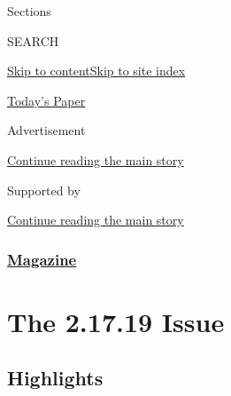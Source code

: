 Sections

SEARCH

\protect\hyperlink{site-content}{Skip to
content}\protect\hyperlink{site-index}{Skip to site index}

\href{https://myaccount.nytimes3xbfgragh.onion/auth/login?response_type=cookie\&client_id=vi}{}

\href{https://www.nytimes3xbfgragh.onion/section/todayspaper}{Today's
Paper}

Advertisement

\protect\hyperlink{after-top}{Continue reading the main story}

Supported by

\protect\hyperlink{after-sponsor}{Continue reading the main story}

\hypertarget{magazine}{%
\subsubsection{\texorpdfstring{\href{/section/magazine}{Magazine}}{Magazine}}\label{magazine}}

\hypertarget{the-21719-issue}{%
\section{The 2.17.19 Issue}\label{the-21719-issue}}

\hypertarget{highlights}{%
\subsection{Highlights}\label{highlights}}

